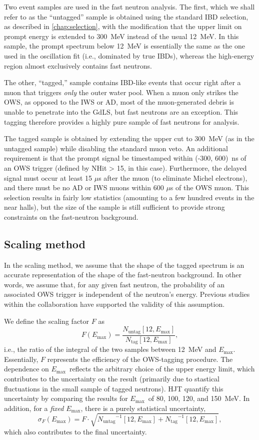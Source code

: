\documentclass[../thesis.tex]{subfiles}
\begin{document}
Two event samples are used in the fast neutron analysis. The first, which we
shall refer to as the ``untagged'' sample is obtained using the standard IBD
selection, as described in \autoref{chap:selection}, with the modification that
the upper limit on prompt energy is extended to 300~MeV instead of the usual
12~MeV. In this sample, the prompt spectrum below 12~MeV is essentially the same
as the one used in the oscillation fit (i.e., dominated by true IBDs), whereas
the high-energy region almost exclusively contains fast neutrons.

The other, ``tagged,'' sample contains IBD-like events that occur right after a
muon that triggers \emph{only} the outer water pool. When a muon only strikes
the OWS, as opposed to the IWS or AD, most of the muon-generated debris is
unable to penetrate into the GdLS, but fast neutrons are an exception. This
tagging therefore provides a highly pure sample of fast neutrons for analysis.

The tagged sample is obtained by extending the upper cut to 300~MeV (as in the
untagged sample) while disabling the standard muon veto. An additional
requirement is that the prompt signal be timestamped within (-300, 600)~ns of an
OWS trigger (defined by NHit > 15, in this case). Furthermore, the delayed
signal must occur at least 15 $\mu$s after the muon (to eliminate Michel
electrons), and there must be no AD or IWS muons within 600 $\mu$s of the OWS
muon. This selection results in fairly low statistics (amounting to a few
hundred events in the near halls), but the size of the sample is still
sufficient to provide strong constraints on the fast-neutron background.

\subsection{Scaling method}
\label{sec:fastn_scaling}

In the scaling method, we assume that the shape of the tagged spectrum is an
accurate representation of the shape of the fast-neutron background. In other
words, we assume that, for any given fast neutron, the probability of an
associated OWS trigger is independent of the neutron's energy. Previous studies
within the collaboration have supported the validity of this assumption.

\def\emax{\ensuremath{E_\mathrm{max}}} \def\ntag{\ensuremath{N_\mathrm{tag}}}
\def\nuntag{\ensuremath{N_\mathrm{untag}}}

We define the scaling factor $F$ as \[ F(\emax) = \frac{\nuntag[12,
    \emax]}{\ntag[12, \emax]}, \] i.e., the ratio of the integral of the two
samples between 12~MeV and \emax. Essentially, $F$ represents the efficiency of
the OWS-tagging procedure. The dependence on \emax\ reflects the arbitrary
choice of the upper energy limit, which contributes to the uncertainty on the
result (primarily due to stastical fluctuations in the small sample of tagged
neutrons). HJT quantify this uncertainty by comparing the results for \emax\ of
80, 100, 120, and 150~MeV. In addition, for a \emph{fixed} \emax, there is a
purely statistical uncertainty,
\[ \sigma_F(\emax) = F \cdot \sqrt{\nuntag^{-1}[12, \emax] + \ntag^{-1}[12,
    \emax]},
\]
which also contributes to the final uncertainty.
\end{document}
